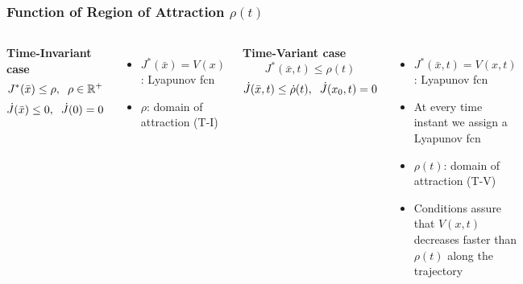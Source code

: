 \documentclass{beamer}
\begin{document}
\begin{frame}
\frametitle{Function of Region of Attraction $\rho (t)$}

\begin{columns}[c] 
\centering
\textbf{Time-Invariant case}
\begin{equation*}
J^{\ast}(\bar{x}) \leq \rho, \hspace{.2cm} \rho \in \mathbb{R}^+
\end{equation*}
\begin{equation*}
\dot{J}(\bar{x}) \leq 0, \hspace{.2cm} \dot{J}(0)=0
\end{equation*}
\begin{itemize}
\item $J^{\ast}(\bar{x})=V(x)$: Lyapunov fcn
\item $\rho$: domain of attraction (T-I)
\end{itemize}

\centering
\textbf{Time-Variant case}
\begin{equation*}
J^{\ast} (\bar{x},t) \leq \rho(t)
\end{equation*}
\begin{equation*}
\dot{J}(\bar{x},t) \leq \dot{\rho}(t), \hspace{.2cm} \dot{J}(x_0,t)=0
\end{equation*}
\begin{itemize}
\item $J^{\ast}(\bar{x},t)=V(x,t)$: Lyapunov fcn
\item At every time instant we assign a Lyapunov fcn
\item $\rho(t)$: domain of attraction (T-V)
\item Conditions assure that $V(x,t)$ decreases faster than $\rho (t)$ along the trajectory

\end{itemize}
\end{columns}

\end{frame}

\end{document}
